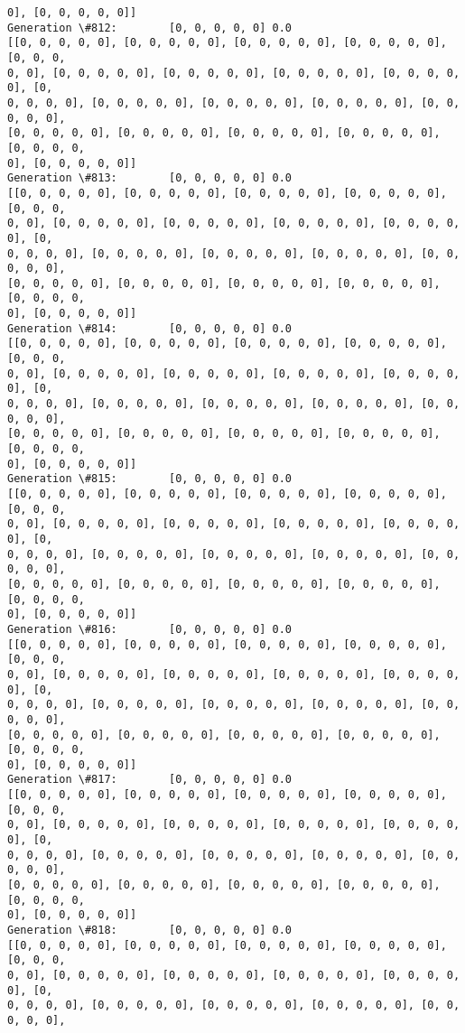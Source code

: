 \documentclass[11pt]{article}
\begin{document}
\begin{Verbatim}[commandchars=\\\{\}]
0], [0, 0, 0, 0, 0]]
Generation \#812:        [0, 0, 0, 0, 0] 0.0
[[0, 0, 0, 0, 0], [0, 0, 0, 0, 0], [0, 0, 0, 0, 0], [0, 0, 0, 0, 0], [0, 0, 0,
0, 0], [0, 0, 0, 0, 0], [0, 0, 0, 0, 0], [0, 0, 0, 0, 0], [0, 0, 0, 0, 0], [0,
0, 0, 0, 0], [0, 0, 0, 0, 0], [0, 0, 0, 0, 0], [0, 0, 0, 0, 0], [0, 0, 0, 0, 0],
[0, 0, 0, 0, 0], [0, 0, 0, 0, 0], [0, 0, 0, 0, 0], [0, 0, 0, 0, 0], [0, 0, 0, 0,
0], [0, 0, 0, 0, 0]]
Generation \#813:        [0, 0, 0, 0, 0] 0.0
[[0, 0, 0, 0, 0], [0, 0, 0, 0, 0], [0, 0, 0, 0, 0], [0, 0, 0, 0, 0], [0, 0, 0,
0, 0], [0, 0, 0, 0, 0], [0, 0, 0, 0, 0], [0, 0, 0, 0, 0], [0, 0, 0, 0, 0], [0,
0, 0, 0, 0], [0, 0, 0, 0, 0], [0, 0, 0, 0, 0], [0, 0, 0, 0, 0], [0, 0, 0, 0, 0],
[0, 0, 0, 0, 0], [0, 0, 0, 0, 0], [0, 0, 0, 0, 0], [0, 0, 0, 0, 0], [0, 0, 0, 0,
0], [0, 0, 0, 0, 0]]
Generation \#814:        [0, 0, 0, 0, 0] 0.0
[[0, 0, 0, 0, 0], [0, 0, 0, 0, 0], [0, 0, 0, 0, 0], [0, 0, 0, 0, 0], [0, 0, 0,
0, 0], [0, 0, 0, 0, 0], [0, 0, 0, 0, 0], [0, 0, 0, 0, 0], [0, 0, 0, 0, 0], [0,
0, 0, 0, 0], [0, 0, 0, 0, 0], [0, 0, 0, 0, 0], [0, 0, 0, 0, 0], [0, 0, 0, 0, 0],
[0, 0, 0, 0, 0], [0, 0, 0, 0, 0], [0, 0, 0, 0, 0], [0, 0, 0, 0, 0], [0, 0, 0, 0,
0], [0, 0, 0, 0, 0]]
Generation \#815:        [0, 0, 0, 0, 0] 0.0
[[0, 0, 0, 0, 0], [0, 0, 0, 0, 0], [0, 0, 0, 0, 0], [0, 0, 0, 0, 0], [0, 0, 0,
0, 0], [0, 0, 0, 0, 0], [0, 0, 0, 0, 0], [0, 0, 0, 0, 0], [0, 0, 0, 0, 0], [0,
0, 0, 0, 0], [0, 0, 0, 0, 0], [0, 0, 0, 0, 0], [0, 0, 0, 0, 0], [0, 0, 0, 0, 0],
[0, 0, 0, 0, 0], [0, 0, 0, 0, 0], [0, 0, 0, 0, 0], [0, 0, 0, 0, 0], [0, 0, 0, 0,
0], [0, 0, 0, 0, 0]]
Generation \#816:        [0, 0, 0, 0, 0] 0.0
[[0, 0, 0, 0, 0], [0, 0, 0, 0, 0], [0, 0, 0, 0, 0], [0, 0, 0, 0, 0], [0, 0, 0,
0, 0], [0, 0, 0, 0, 0], [0, 0, 0, 0, 0], [0, 0, 0, 0, 0], [0, 0, 0, 0, 0], [0,
0, 0, 0, 0], [0, 0, 0, 0, 0], [0, 0, 0, 0, 0], [0, 0, 0, 0, 0], [0, 0, 0, 0, 0],
[0, 0, 0, 0, 0], [0, 0, 0, 0, 0], [0, 0, 0, 0, 0], [0, 0, 0, 0, 0], [0, 0, 0, 0,
0], [0, 0, 0, 0, 0]]
Generation \#817:        [0, 0, 0, 0, 0] 0.0
[[0, 0, 0, 0, 0], [0, 0, 0, 0, 0], [0, 0, 0, 0, 0], [0, 0, 0, 0, 0], [0, 0, 0,
0, 0], [0, 0, 0, 0, 0], [0, 0, 0, 0, 0], [0, 0, 0, 0, 0], [0, 0, 0, 0, 0], [0,
0, 0, 0, 0], [0, 0, 0, 0, 0], [0, 0, 0, 0, 0], [0, 0, 0, 0, 0], [0, 0, 0, 0, 0],
[0, 0, 0, 0, 0], [0, 0, 0, 0, 0], [0, 0, 0, 0, 0], [0, 0, 0, 0, 0], [0, 0, 0, 0,
0], [0, 0, 0, 0, 0]]
Generation \#818:        [0, 0, 0, 0, 0] 0.0
[[0, 0, 0, 0, 0], [0, 0, 0, 0, 0], [0, 0, 0, 0, 0], [0, 0, 0, 0, 0], [0, 0, 0,
0, 0], [0, 0, 0, 0, 0], [0, 0, 0, 0, 0], [0, 0, 0, 0, 0], [0, 0, 0, 0, 0], [0,
0, 0, 0, 0], [0, 0, 0, 0, 0], [0, 0, 0, 0, 0], [0, 0, 0, 0, 0], [0, 0, 0, 0, 0],

\end{Verbatim}
\end{document}
